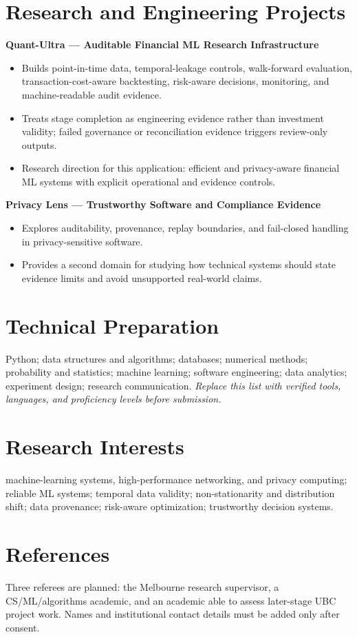 \documentclass[11pt]{article}
\begin{document}
\section*{Research and Engineering Projects}
\textbf{Quant-Ultra --- Auditable Financial ML Research Infrastructure}
\begin{itemize}
\item Builds point-in-time data, temporal-leakage controls, walk-forward evaluation, transaction-cost-aware backtesting, risk-aware decisions, monitoring, and machine-readable audit evidence.
\item Treats stage completion as engineering evidence rather than investment validity; failed governance or reconciliation evidence triggers review-only outputs.
\item Research direction for this application: efficient and privacy-aware financial ML systems with explicit operational and evidence controls.
\end{itemize}

\begin{samepage}
\textbf{Privacy Lens --- Trustworthy Software and Compliance Evidence}
\begin{itemize}
\item Explores auditability, provenance, replay boundaries, and fail-closed handling in privacy-sensitive software.
\item Provides a second domain for studying how technical systems should state evidence limits and avoid unsupported real-world claims.
\end{itemize}
\end{samepage}

\section*{Technical Preparation}
Python; data structures and algorithms; databases; numerical methods; probability and statistics; machine learning; software engineering; data analytics; experiment design; research communication. \textit{Replace this list with verified tools, languages, and proficiency levels before submission.}

\section*{Research Interests}
machine-learning systems, high-performance networking, and privacy computing; reliable ML systems; temporal data validity; non-stationarity and distribution shift; data provenance; risk-aware optimization; trustworthy decision systems.

\section*{References}
Three referees are planned: the Melbourne research supervisor, a CS/ML/algorithms academic, and an academic able to assess later-stage UBC project work. Names and institutional contact details must be added only after consent.
\end{document}
